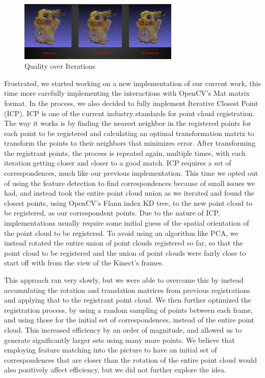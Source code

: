 \documentclass[11pt,oneside,english]{article}
\begin{document}
\begin{figure}
  \begin{center}
    \includegraphics[width=0.68\textwidth]{pika3}
  \end{center}
  \caption{Quality over Iterations}
\end{figure}

Frustrated, we started working on a new implementation of our current work, this
time more carefully implementing the interactions with OpenCV's Mat matrix
format. In the process, we also decided to fully implement Iterative Closest
Point (ICP). ICP is one of the current industry standards for point cloud
registration. The way it works is by finding the nearest neighbor in the
registered points for each point to be registered and calculating an optimal
transformation matrix to transform the points to their neighbors that minimizes
error. After transforming the registrant points, the process is repeated again,
multiple times, with each iteration getting closer and closer to a good match.
ICP requires a set of correspondences, much like our previous implementation.
This time we opted out of using the feature detection to find correspondences
because of small issues we had, and instead took the entire point cloud union as
we iterated and found the closest points, using OpenCV's Flann index KD tree, to
the new point cloud to be registered, as our correspondent points. Due to the
nature of ICP, implementations usually require some initial guess of the spatial
orientation of the point cloud to be registered. To avoid using an algorithm
like PCA, we instead rotated the entire union of point clouds registered so far,
so that the point cloud to be registered and the union of point clouds were
fairly close to start off with from the view of the Kinect’s frames.

This approach ran very slowly, but we were able to overcome this by instead
accumulating the rotation and translation matrices from previous registrations
and applying that to the registrant point cloud. We then further optimized the
registration process, by using a random sampling of points between each frame,
and using those for the initial set of correspondences, instead of the entire
point cloud. This increased efficiency by an order of magnitude, and allowed us
to generate significantly larger sets using many more points. We believe that
employing feature matching into the picture to have an initial set of
correspondences that are closer than the rotation of the entire point cloud
would also positively affect efficiency, but we did not further explore the
idea.
\end{document}
